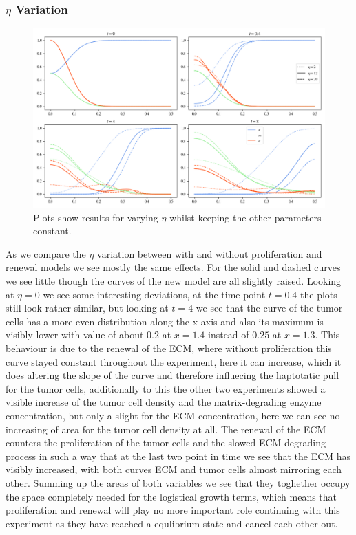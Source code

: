 \subsubsection*{$\eta$ Variation}
\begin{figure}[h]
    \centering
    \includegraphics[width=\textwidth]{resources/images/prolif_eta_variation.png}
    \caption{Plots show results for varying $\eta$ whilst keeping the other parameters constant.}
    \label{fig:prolif_eta_variation}
\end{figure}

As we compare the $\eta$ variation between with and without proliferation and renewal models we see mostly the same effects. For the solid and dashed curves we see little though the curves of the new model are all slightly raised. Looking at $\eta=0$ we see some interesting deviations, at the time point $t=0.4$ the plots still look rather similar, but looking at $t=4$ we see that the curve of the tumor cells has a more even distribution along the x-axis and also its maximum is visibly lower with value of about $0.2$ at $x=1.4$ instead of $0.25$ at $x=1.3$. This behaviour is due to the renewal of the ECM, where without proliferation this curve stayed constant throughout the experiment, here it can increase, which it does altering the slope of the curve and therefore influecing the haptotatic pull for the tumor cells, additionally to this the other two experiments showed a visible increase of the tumor cell density and the matrix-degrading enzyme concentration, but only a slight for the ECM concentration, here we can see no increasing of area for the tumor cell density at all. The renewal of the ECM counters the proliferation of the tumor cells and the slowed ECM degrading process in such a way that at the last two point in time we see that the ECM has visibly increased, with both curves ECM and tumor cells almost mirroring each other. Summing up the areas of both variables we see that they toghether occupy the space completely needed for the logistical growth terms, which means that proliferation and renewal will play no more important role continuing with this experiment as they have reached a equlibrium state and cancel each other out. 


